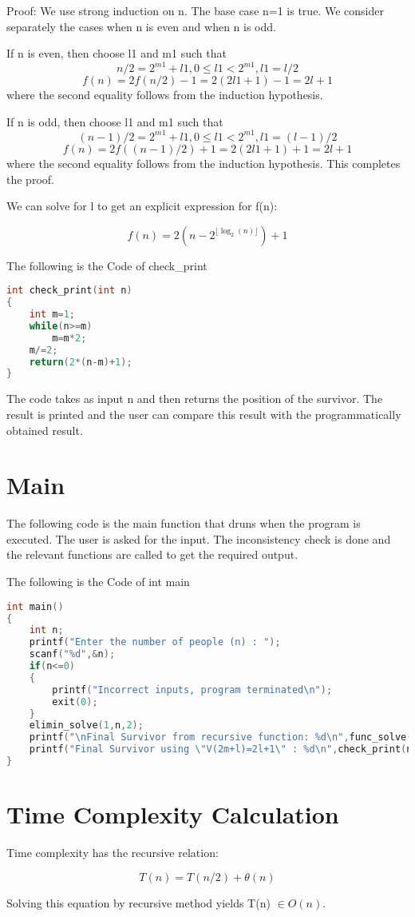 \documentclass{article}
\begin{document}
Proof: We use strong induction on n. The base case n=1 is true. We consider separately the cases when n is even and when n is odd.

If n is even, then choose l1 and m1 such that \[ n/2 = 2^{m1}+l1 , 0 \leq l1 < 2^{m1}, l1=l/2 \]
\[f(n) = 2f(n/2)-1 = 2(2l1+1)-1 = 2l+1 \]
where the second equality follows from the induction hypothesis.

If n is odd, then choose l1 and m1 such that \[ (n-1)/2 = 2^{m1}+l1 , 0\leq l1 < 2^{m1}, l1 = (l-1)/2 \]
\[ f(n) = 2f((n-1)/2)+1=2(2l1+1) + 1=2l+1 \]
where the second equality follows from the induction hypothesis. This completes the proof.

We can solve for l to get an explicit expression for f(n):

\[ f(n) = 2(n-2^{\lfloor \log_2(n) \rfloor})+1 \]

The following is the Code of check\_print
\begin{lstlisting}[language=c, caption=check\_print]
int check_print(int n)
{
    int m=1;
    while(n>=m)
        m=m*2;
    m/=2;
    return(2*(n-m)+1);
}
\end{lstlisting}

The code takes as input n and then returns the position of the survivor. The result is printed and the user can compare this result with the programmatically obtained result.

\section{Main}

The following code is the main function that druns when the program is executed. The user is asked for the input. The inconsistency check is done and the relevant functions are called to get the required output.

The following is the Code of int main
\begin{lstlisting}[language=c, caption=main]
int main()
{
    int n;
    printf("Enter the number of people (n) : ");
    scanf("%d",&n);
    if(n<=0)
    {
        printf("Incorrect inputs, program terminated\n");
        exit(0);
    }
    elimin_solve(1,n,2);
    printf("\nFinal Survivor from recursive function: %d\n",func_solve(n));
    printf("Final Survivor using \"V(2m+l)=2l+1\" : %d\n",check_print(n));
}
\end{lstlisting}

\section{Time Complexity Calculation}

Time complexity has the recursive relation:

\[ T(n) = T(n/2) + \theta(n) \]

Solving this equation by recursive method yields T(n) $\in O(n)$.
\end{document}
